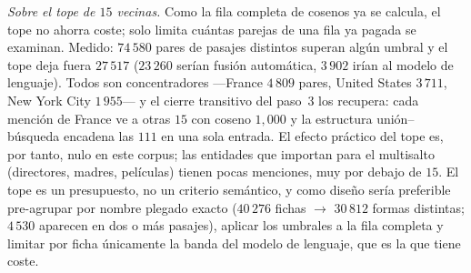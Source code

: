 \documentclass[11pt,a4paper]{article}
\begin{document}
\emph{Sobre el tope de $15$ vecinas.} Como la fila completa de cosenos ya
se calcula, el tope no ahorra coste; solo limita cuántas parejas de una
fila ya pagada se examinan. Medido: $74\,580$ pares de pasajes distintos
superan algún umbral y el tope deja fuera $27\,517$ ($23\,260$ serían
fusión automática, $3\,902$ irían al modelo de lenguaje). Todos son
concentradores ---\guillemotleft{}France\guillemotright{} $4\,809$ pares, \guillemotleft{}United States\guillemotright{} $3\,711$,
\guillemotleft{}New York City\guillemotright{} $1\,955$--- y el cierre transitivo del paso~3 los
recupera: cada mención de \guillemotleft{}France\guillemotright{} ve a otras $15$ con coseno $1{,}000$ y
la estructura unión--búsqueda encadena las $111$ en una sola entrada. El
efecto práctico del tope es, por tanto, nulo en este corpus; las entidades
que importan para el multisalto (directores, madres, películas) tienen
pocas menciones, muy por debajo de $15$. El tope es un presupuesto, no un
criterio semántico, y como diseño sería preferible pre-agrupar por nombre
plegado exacto ($40\,276$ fichas $\to$ $30\,812$ formas distintas; $4\,530$
aparecen en dos o más pasajes), aplicar los umbrales a la fila completa y
limitar por ficha únicamente la banda del modelo de lenguaje, que es la que
tiene coste.
\end{document}
